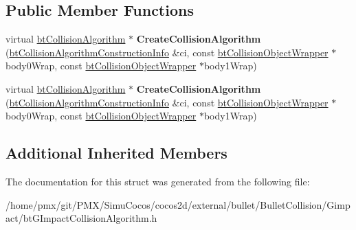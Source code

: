 \subsection*{Public Member Functions}
\begin{DoxyCompactItemize}
\item 
\mbox{\label{structbtGImpactCollisionAlgorithm_1_1CreateFunc_a61204984d563abeb3ffd09e7602240c1}} 
virtual \hyperlink{classbtCollisionAlgorithm}{bt\+Collision\+Algorithm} $\ast$ {\bfseries Create\+Collision\+Algorithm} (\hyperlink{structbtCollisionAlgorithmConstructionInfo}{bt\+Collision\+Algorithm\+Construction\+Info} \&ci, const \hyperlink{structbtCollisionObjectWrapper}{bt\+Collision\+Object\+Wrapper} $\ast$body0\+Wrap, const \hyperlink{structbtCollisionObjectWrapper}{bt\+Collision\+Object\+Wrapper} $\ast$body1\+Wrap)
\item 
\mbox{\label{structbtGImpactCollisionAlgorithm_1_1CreateFunc_a61204984d563abeb3ffd09e7602240c1}} 
virtual \hyperlink{classbtCollisionAlgorithm}{bt\+Collision\+Algorithm} $\ast$ {\bfseries Create\+Collision\+Algorithm} (\hyperlink{structbtCollisionAlgorithmConstructionInfo}{bt\+Collision\+Algorithm\+Construction\+Info} \&ci, const \hyperlink{structbtCollisionObjectWrapper}{bt\+Collision\+Object\+Wrapper} $\ast$body0\+Wrap, const \hyperlink{structbtCollisionObjectWrapper}{bt\+Collision\+Object\+Wrapper} $\ast$body1\+Wrap)
\end{DoxyCompactItemize}
\subsection*{Additional Inherited Members}


The documentation for this struct was generated from the following file\+:\begin{DoxyCompactItemize}
\item 
/home/pmx/git/\+P\+M\+X/\+Simu\+Cocos/cocos2d/external/bullet/\+Bullet\+Collision/\+Gimpact/bt\+G\+Impact\+Collision\+Algorithm.\+h\end{DoxyCompactItemize}
